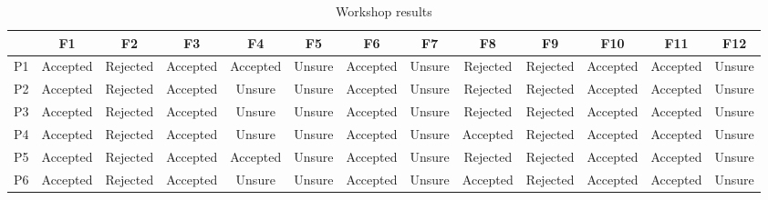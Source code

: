 \begin{table*}[]
\centering
\caption{Workshop results}
\label{tab:Workshop}
\begin{tabular}{c|c|c|c|c|c|c|c|c|c|c|c|c}
   & F1        & F2 & F3        & F4        & F5 & F6        & F7 & F8        & F9 & F10       & F11       & F12 \\ \hline
P1 & Accepted & Rejected   & Accepted & Accepted & Unsure  & Accepted & Unsure  & Rejected          & Rejected   & Accepted & Accepted & Unsure   \\
P2 & Accepted & Rejected   & Accepted & Unsure         & Unsure  & Accepted & Unsure  & Rejected          & Rejected   & Accepted & Accepted & Unsure   \\
P3 & Accepted & Rejected   & Accepted & Unsure         & Unsure  & Accepted & Unsure  & Rejected          & Rejected   & Accepted & Accepted & Unsure   \\
P4 & Accepted & Rejected   & Accepted & Unsure         & Unsure  & Accepted & Unsure  & Accepted & Rejected   & Accepted & Accepted & Unsure   \\
P5 & Accepted & Rejected   & Accepted & Accepted & Unsure  & Accepted & Unsure  & Rejected          & Rejected   & Accepted & Accepted & Unsure   \\
P6 & Accepted & Rejected   & Accepted & Unsure         & Unsure  & Accepted & Unsure  & Accepted & Rejected   & Accepted & Accepted & Unsure   \\ \hline
\end{tabular}
\end{table*}